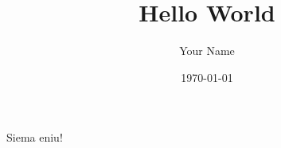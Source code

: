 \documentclass{article}
\title{Hello World}
\author{Your Name}
\date{\today}
\begin{document}
\maketitle

Siema eniu!
\end{document}
